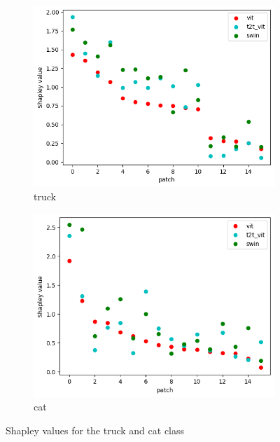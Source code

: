 \documentclass[magisterska,en]{pracamgr}
\begin{document}
\begin{figure}[H]
\centering
\begin{subfigure}{.49\textwidth}
  \includegraphics[width=1\linewidth]{./images/Truck_shapley.png}
  \caption{truck}
\end{subfigure}
\begin{subfigure}{.49\textwidth}
  \includegraphics[width=1\linewidth]{./images/Cat_shapley.png}
  \caption{cat}
\end{subfigure}
\caption{Shapley values for the truck and cat class}
\label{Truck_shapley}
\label{Cat_shapley}
\end{figure}
\end{document}
